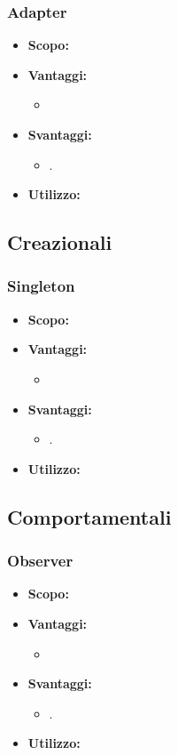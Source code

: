     \subsubsection{Adapter}
      \begin{itemize}
       \item \textbf{Scopo:}
	\item \textbf{Vantaggi:}
	  \begin{itemize}
	   \item 
	  \end{itemize}
	\item \textbf{Svantaggi:}
	  \begin{itemize}
	   \item .
	  \end{itemize}
	\item \textbf{Utilizzo:}
	\end{itemize}
	
  \subsection{Creazionali}
  
    \subsubsection{Singleton}
      \begin{itemize}
       \item \textbf{Scopo:}
	\item \textbf{Vantaggi:}
	  \begin{itemize}
	   \item 
	  \end{itemize}
	\item \textbf{Svantaggi:}
	  \begin{itemize}
	   \item .
	  \end{itemize}
	\item \textbf{Utilizzo:}
	\end{itemize}
	
  \subsection{Comportamentali}
  
    \subsubsection{Observer}
      \begin{itemize}
       \item \textbf{Scopo:}
	\item \textbf{Vantaggi:}
	  \begin{itemize}
	   \item 
	  \end{itemize}
	\item \textbf{Svantaggi:}
	  \begin{itemize}
	   \item .
	  \end{itemize}
	\item \textbf{Utilizzo:}
	\end{itemize}